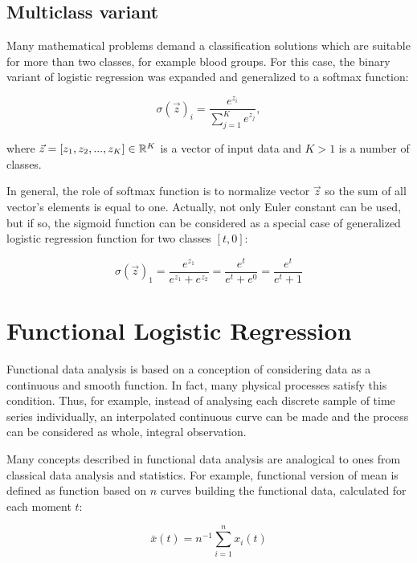 \documentclass[energies,article,submit,pdftex,moreauthors]{Definitions/mdpi}
\begin{document}
\vspace{5mm}
\subsection{Multiclass variant}

Many mathematical problems demand a classification solutions which are suitable for more than two classes, for example blood groups. For this case, the binary variant of logistic regression was expanded and generalized to a softmax function:
\begin{linenomath}
\begin{equation}
\sigma(\vec{z})_i = \frac{e^{z_i}}{\sum_{j=1}^{K} e^{z_j}},
\end{equation}
\end{linenomath}
where $\vec{z} = [z_1, z_2, ..., z_K] \in {\Bbb R}^K$ is a vector of input data and $ K > 1 $ is a number of classes.

In general, the role of softmax function is to normalize vector $\vec{z}$ so the sum of all vector's elements is equal to one. Actually, not only Euler constant can be used, but if so, the sigmoid function can be considered as a special case of generalized logistic regression function for two classes $[t, 0]$:
\begin{linenomath}
\begin{equation}
\sigma(\vec{z})_1 = \frac{e^{z_1}}{e^{z_1}+e^{z_2}} = \frac{e^{t}}{e^{t}+e^{0}} = \frac{e^{t}}{e^{t}+1}
\end{equation}
\end{linenomath}


\section{Functional Logistic Regression}

Functional data analysis is based on a conception of considering data as a continuous and smooth function. In fact, many physical processes satisfy this condition. Thus, for example, instead of analysing each discrete sample of time series individually, an interpolated continuous curve can be made and the process can be considered as whole, integral observation.

Many concepts described in functional data analysis are analogical to ones from classical data analysis and statistics. For example, functional version of mean is defined as function based on $ n $ curves building the functional data, calculated for each moment $ t $:
\begin{linenomath}
\begin{equation}
\bar{x}(t) = n^{-1} \sum_{i=1}^{n} x_i (t)
\end{equation}
\end{linenomath}
\end{document}
